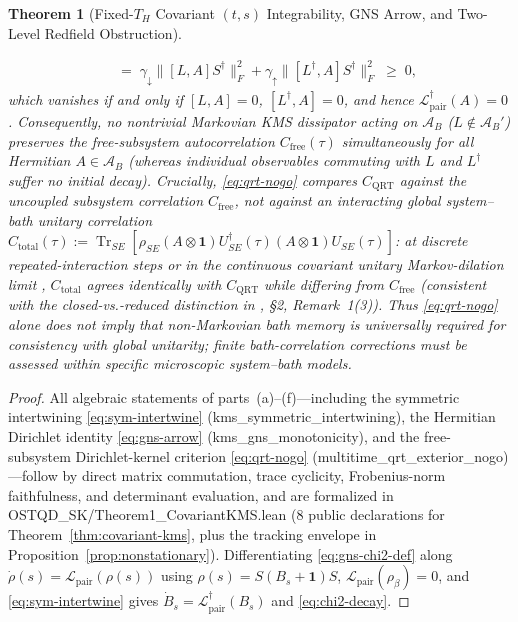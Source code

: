 \documentclass[11pt,a4paper]{article}
\newtheorem{theorem}{Theorem}
\theoremstyle{definition}
\theoremstyle{remark}
\newcommand{\Tr}{\operatorname{Tr}}
\newcommand{\cA}{\mathcal{A}}
\newcommand{\cL}{\mathcal{L}}
\newcommand{\1}{\mathbf{1}}
\newcommand{\normF}[1]{\|#1\|_F}
\newcommand{\code}[1]{{\scriptsize\ttfamily #1}}
\begin{document}
\begin{theorem}[Fixed-$T_H$ Covariant $(t,s)$ Integrability, GNS Arrow, and Two-Level Redfield Obstruction]
\begin{enumerate}
\begin{equation}
\begin{aligned}
      &\;=\; \gamma_\downarrow\normF{[L,A]S^\dagger}^2 + \gamma_\uparrow\normF{[L^\dagger,A]S^\dagger}^2 \;\ge\; 0,
    \end{aligned}
  \end{equation}
  which vanishes \emph{if and only if} $[L, A] = 0$, $[L^\dagger, A] = 0$, and hence $\cL_{\mathrm{pair}}^\dagger(A) = 0$. Consequently, no nontrivial Markovian KMS dissipator acting on $\cA_B$ ($L\notin\cA_B'$) preserves the \emph{free-subsystem} autocorrelation $C_{\mathrm{free}}(\tau)$ simultaneously for all Hermitian $A\in\cA_B$ (whereas individual observables commuting with $L$ and $L^\dagger$ suffer no initial decay). Crucially, \eqref{eq:qrt-nogo} compares $C_{\mathrm{QRT}}$ against the uncoupled subsystem correlation $C_{\mathrm{free}}$, \emph{not} against an interacting global system--bath unitary correlation $C_{\mathrm{total}}(\tau) := \Tr_{SE}[\rho_{SE}(A\otimes\1)U_{SE}^\dagger(\tau)(A\otimes\1)U_{SE}(\tau)]$: at discrete repeated-interaction steps or in the continuous covariant unitary Markov-dilation limit \cite{Frigerio1985,AttalJoye2007}, $C_{\mathrm{total}}$ agrees identically with $C_{\mathrm{QRT}}$ while differing from $C_{\mathrm{free}}$ (consistent with the closed-vs.-reduced distinction in \cite{Soga2026OSTQD}, \S2, Remark~1(3)). Thus \eqref{eq:qrt-nogo} alone does not imply that non-Markovian bath memory is universally required for consistency with global unitarity; finite bath-correlation corrections must be assessed within specific microscopic system--bath models.
\end{enumerate}
\end{theorem}

\begin{proof}
All algebraic statements of parts~(a)--(f)---including the symmetric intertwining \eqref{eq:sym-intertwine} (\code{kms\_\allowbreak symmetric\_\allowbreak intertwining}), the Hermitian Dirichlet identity \eqref{eq:gns-arrow} (\code{kms\_\allowbreak gns\_\allowbreak monotonicity}), and the free-subsystem Dirichlet-kernel criterion \eqref{eq:qrt-nogo} (\code{multitime\_\allowbreak qrt\_\allowbreak exterior\_\allowbreak nogo})---follow by direct matrix commutation, trace cyclicity, Frobenius-norm faithfulness, and determinant evaluation, and are formalized in \code{OSTQD\_\allowbreak SK/\allowbreak Theorem1\_\allowbreak CovariantKMS.lean} (8 public declarations for Theorem~\ref{thm:covariant-kms}, plus the tracking envelope in Proposition~\ref{prop:nonstationary}). Differentiating \eqref{eq:gns-chi2-def} along $\dot{\rho}(s)=\cL_{\mathrm{pair}}(\rho(s))$ using $\rho(s)=S(B_s+\1)S$, $\cL_{\mathrm{pair}}(\rho_\beta)=0$, and \eqref{eq:sym-intertwine} gives $\dot{B}_s=\cL_{\mathrm{pair}}^\dagger(B_s)$ and \eqref{eq:chi2-decay}.
\end{proof}
\end{document}
